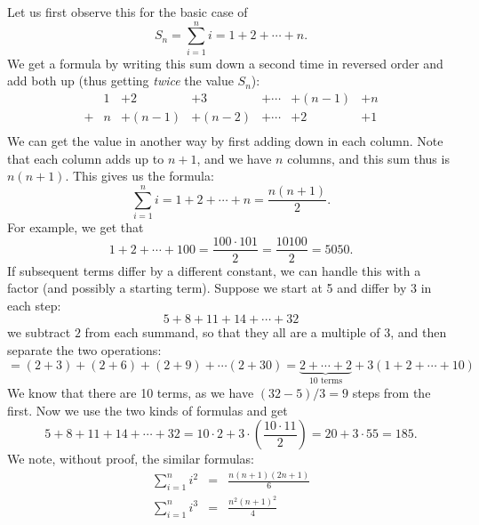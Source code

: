 Let us first observe this for the basic case of 
\[
S_n=\sum_{i=1}^n i=1+2+\cdots+n.
\]
We get a formula by writing this sum down a second time in reversed order
and add both up (thus getting {\em twice} the value $S_n$):
\[
\begin{array}{ccccccc}
&1&+2&+3&+\cdots&+(n-1)&+n\\
+&n&+(n-1)&+(n-2)&+\cdots&+2&+1\\
\end{array}
\]
We can get the value in another way by first adding down in each column.
Note that each column adds up to $n+1$, and we have $n$ columns, and this
sum thus is $n(n+1)$. This gives us the formula:
\[
\sum_{i=1}^n i=1+2+\cdots+n=\frac{n(n+1)}{2}.
\]
For example, we get that
\[
1+2+\cdots+100=\frac{100\cdot 101}{2}=\frac{10100}{2}=5050.
\]
If subsequent terms differ by a different constant, we can handle this with
a factor (and possibly a starting term). Suppose we start at 5 and differ by
3 in each step:
\[
5+8+11+14+\cdots+32
\]
we subtract $2$ from each summand, so that they all are a multiple of $3$,
and then separate the two operations:
\[
=(2+3)+(2+6)+(2+9)+\cdots(2+30)=\underbrace{2+\cdots+2}_{\mbox{$10$ terms}}
+3\left(1+2+\cdots+10\right)
\]
We know that there are 10 terms, as we have $(32-5)/3=9$ steps from the
first. Now we use the two kinds of formulas and get
\[
5+8+11+14+\cdots+32=10\cdot 2+ 3\cdot\left(\frac{10\cdot
11}{2}\right)=20+3\cdot 55=185.
\]
We note, without proof, the similar formulas:
\begin{eqnarray*}
\sum_{i=1}^n i^2&=&\frac{n(n+1)(2n+1)}{6}\\
\sum_{i=1}^n i^3&=&\frac{n^2(n+1)^2}{4}\\
\end{eqnarray*}

%
%

